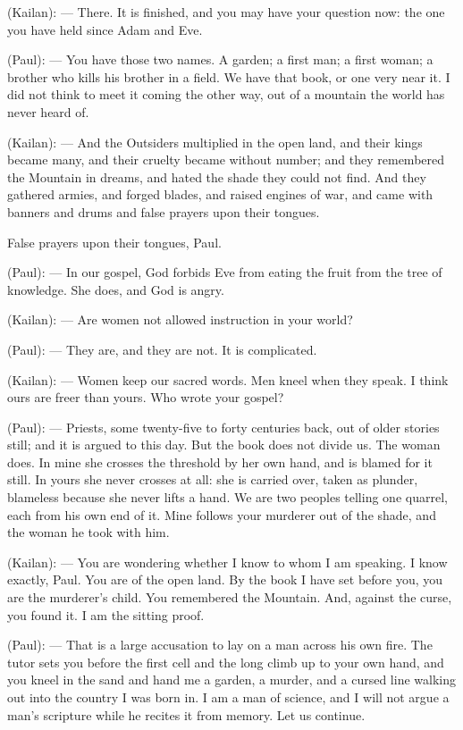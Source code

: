 \begin{room}

(Kailan): --- There. It is finished, and you may have your question now: the one you have held since Adam and Eve.

(Paul): --- You have those two names. A garden; a first man; a first woman; a brother who kills his brother in a field. We have that book, or one very near it. I did not think to meet it coming the other way, out of a mountain the world has never heard of.

\begin{scripture}
(Kailan): --- And the Outsiders multiplied in the open land, and their kings became many, and their cruelty became without number; and they remembered the Mountain in dreams, and hated the shade they could not find. And they gathered armies, and forged blades, and raised engines of war, and came with banners and drums and false prayers upon their tongues.
\end{scripture}

False prayers upon their tongues, Paul.

(Paul): --- In our gospel, God forbids Eve from eating the fruit from the tree of knowledge. She does, and God is angry.

(Kailan): --- Are women not allowed instruction in your world?

(Paul): --- They are, and they are not. It is complicated.

(Kailan): --- Women keep our sacred words. Men kneel when they speak. I think ours are freer than yours. Who wrote your gospel?

(Paul): --- Priests, some twenty-five to forty centuries back, out of older stories still; and it is argued to this day. But the book does not divide us. The woman does. In mine she crosses the threshold by her own hand, and is blamed for it still. In yours she never crosses at all: she is carried over, taken as plunder, blameless because she never lifts a hand. We are two peoples telling one quarrel, each from his own end of it. Mine follows your murderer out of the shade, and the woman he took with him.

(Kailan): --- You are wondering whether I know to whom I am speaking. I know exactly, Paul. You are of the open land. By the book I have set before you, you are the murderer's child. You remembered the Mountain. And, against the curse, you found it. I am the sitting proof.

(Paul): --- That is a large accusation to lay on a man across his own fire. The tutor sets you before the first cell and the long climb up to your own hand, and you kneel in the sand and hand me a garden, a murder, and a cursed line walking out into the country I was born in. I am a man of science, and I will not argue a man's scripture while he recites it from memory. Let us continue.

\end{room}

